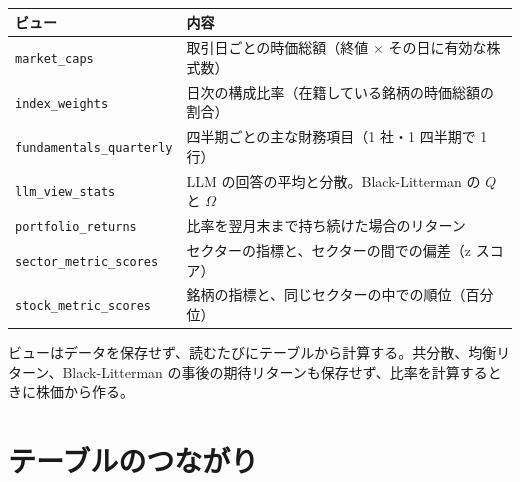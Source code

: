 \documentclass[xelatex,ja=standard,jafont=hiragino-pron,a4paper,10pt]{bxjsreport}
\newcommand{\code}[1]{\texttt{#1}}
\begin{document}
\begin{longtable}{p{4.60cm}p{9.80cm}}
\toprule
\textbf{ビュー} & \textbf{内容} \\
\midrule
\endfirsthead
\bottomrule
\endfoot
\code{market\_caps} & 取引日ごとの時価総額（終値 $\times$ その日に有効な株式数） \\
\code{index\_weights} & 日次の構成比率（在籍している銘柄の時価総額の割合） \\
\code{fundamentals\_quarterly} & 四半期ごとの主な財務項目（1 社・1 四半期で 1 行） \\
\code{llm\_view\_stats} & LLM の回答の平均と分散。Black-Litterman の $Q$ と $\Omega$ \\
\code{portfolio\_returns} & 比率を翌月末まで持ち続けた場合のリターン \\
\code{sector\_metric\_scores} & セクターの指標と、セクターの間での偏差（z スコア） \\
\code{stock\_metric\_scores} & 銘柄の指標と、同じセクターの中での順位（百分位） \\
\end{longtable}

ビューはデータを保存せず、読むたびにテーブルから計算する。共分散、均衡リターン、Black-Litterman の事後の期待リターンも保存せず、比率を計算するときに株価から作る。

\section{テーブルのつながり}
\end{document}
